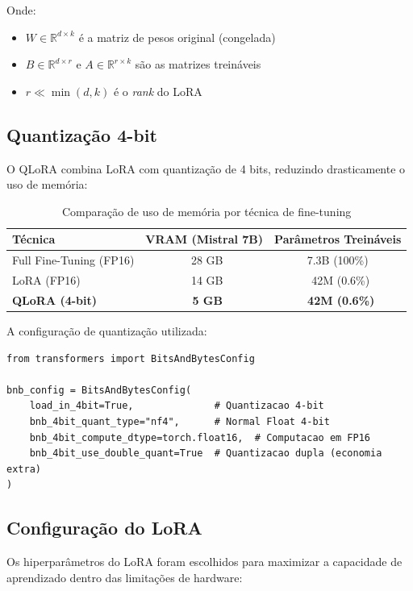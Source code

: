 Onde:
\begin{itemize}
    \item $W \in \mathbb{R}^{d \times k}$ é a matriz de pesos original (congelada)
    \item $B \in \mathbb{R}^{d \times r}$ e $A \in \mathbb{R}^{r \times k}$ são as matrizes treináveis
    \item $r \ll \min(d, k)$ é o \textit{rank} do LoRA
\end{itemize}

\subsection{Quantização 4-bit}

O QLoRA combina LoRA com quantização de 4 bits, reduzindo drasticamente o uso de memória:

\begin{table}[H]
\centering
\caption{Comparação de uso de memória por técnica de fine-tuning}
\label{tab:memoria-tecnicas}
\begin{tabular}{lcc}
\toprule
\textbf{Técnica} & \textbf{VRAM (Mistral 7B)} & \textbf{Parâmetros Treináveis} \\
\midrule
Full Fine-Tuning (FP16) & ~28 GB & 7.3B (100\%) \\
LoRA (FP16) & ~14 GB & ~42M (0.6\%) \\
\textbf{QLoRA (4-bit)} & \textbf{~5 GB} & \textbf{~42M (0.6\%)} \\
\bottomrule
\end{tabular}
\end{table}

A configuração de quantização utilizada:

\begin{lstlisting}[caption={Configuração de quantização 4-bit}, label={lst:bnb-config}]
from transformers import BitsAndBytesConfig

bnb_config = BitsAndBytesConfig(
    load_in_4bit=True,              # Quantizacao 4-bit
    bnb_4bit_quant_type="nf4",      # Normal Float 4-bit
    bnb_4bit_compute_dtype=torch.float16,  # Computacao em FP16
    bnb_4bit_use_double_quant=True  # Quantizacao dupla (economia extra)
)
\end{lstlisting}

\subsection{Configuração do LoRA}

Os hiperparâmetros do LoRA foram escolhidos para maximizar a capacidade de aprendizado dentro das limitações de hardware:


